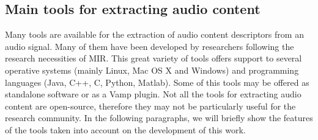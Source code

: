\subsection{Main tools for extracting audio content}
Many tools are available for the extraction of audio content descriptors from an audio signal. Many of them have been developed by researchers following the research necessities of MIR. This great variety of tools offers support to several operative systems (mainly Linux, Mac OS X and Windows) and programming languages (Java, C++, C, Python, Matlab). Some of this tools may be offered as standalone software or as a Vamp plugin. Not all the tools for extracting audio content are open-source, therefore they may not be particularly useful for the research community. In the following paragraphs, we will briefly show the features of the tools taken into account on the development of this work.



